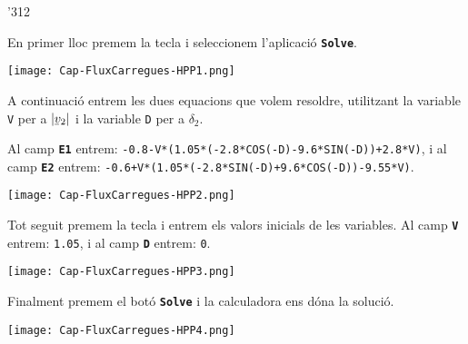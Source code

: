 \begin{dingautolist}{'312}

    \item En primer lloc premem la tecla  i seleccionem l'aplicació \texttt{\textbf{Solve}}.

         \texttt{[image: Cap-FluxCarregues-HPP1.png]}

    \item A continuació entrem les dues equacions que volem resoldre, utilitzant la variable \texttt{V} per a $|\cmplx{v}_2|$ i la variable \texttt{D} per a $\delta_2$.

        Al camp \texttt{\textbf{E1}} entrem: \texttt{-0.8-V*(1.05*(-2.8*COS(-D)-9.6*SIN(-D))+2.8*V)}, i al camp \texttt{\textbf{E2}} entrem: \texttt{-0.6+V*(1.05*(-2.8*SIN(-D)+9.6*COS(-D))-9.55*V)}.

        \texttt{[image: Cap-FluxCarregues-HPP2.png]}

    \item Tot seguit premem la tecla  i entrem els valors inicials de les variables. Al camp \texttt{\textbf{V}} entrem: \texttt{1.05}, i al camp \texttt{\textbf{D}} entrem: \texttt{0}.

        \texttt{[image: Cap-FluxCarregues-HPP3.png]}

    \item  Finalment premem el botó \texttt{\textbf{Solve}} i la calculadora ens dóna  la solució.

        \texttt{[image: Cap-FluxCarregues-HPP4.png]}

\end{dingautolist}
